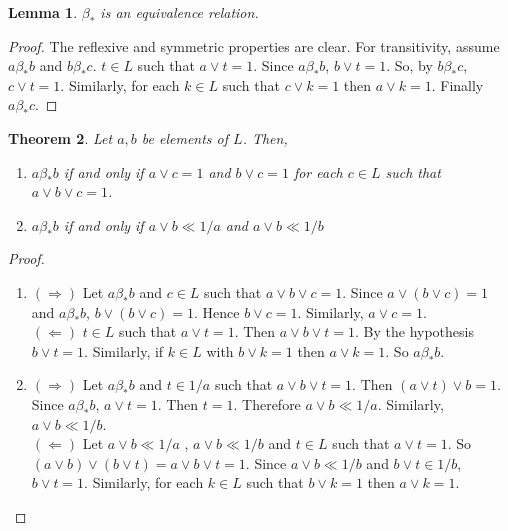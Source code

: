 \documentclass[a4paper,12pt]{article}
\newtheorem{theorem}{Theorem}[section]
\newtheorem{lemma}[theorem]{Lemma}
\numberwithin{equation}{section}
\begin{document}
\begin{lemma} \label{2}
  $ \beta_* $ is an equivalence relation.
\end{lemma}
\begin{proof}
  The reflexive and symmetric properties are clear. For transitivity, assume $ a \beta_*b $ and $ b \beta_* c $. 
  $ t \in L $ such that $ a \vee t = 1 $. Since $ a \beta_*b $, $ b \vee t = 1 $. So,  by $ b \beta_* c $, 
  $ c \vee t = 1 $. Similarly, for each $ k \in L $ such that $ c \vee k = 1 $ then $ a \vee k=1 $. 
  Finally $ a \beta_* c $.

\end{proof}

\begin{theorem} \label{3}
  Let $ a,b $ be elements of $ L $. Then,
  \begin{enumerate}[label=(\roman{*}), ref=(\roman{*})]

    \item
      $ a \beta_* b $ if and only if $ a \vee c = 1 $ and $ b \vee c = 1 $ for each $ c \in L $ 
      such that $ a \vee b  \vee c = 1 $.  \label{3.1}

    \item
      $ a \beta_* b $ if and only if $ a \vee b \ll 1/a $ and $ a \vee b \ll 1/b $  \label{3.2}

  \end{enumerate}
\end{theorem}


\begin{proof}
  \begin{enumerate}
    \item
      $ ( \Rightarrow ) $
      Let $ a \beta_* b$ and $ c \in L $ such that $ a \vee b \vee c = 1 $. Since $ a \vee ( b \vee c ) = 1 $ and 
      $ a \beta_* b $, $ b \vee ( b \vee c ) = 1 $. Hence $ b \vee c = 1 $. Similarly, $ a \vee c = 1 $. \\
      $( \Leftarrow )$
      $ t \in L $ such that $ a \vee t = 1 $. 
      Then $ a \vee b \vee t = 1 $. By the hypothesis $ b \vee t = 1 $. 
      Similarly, if $ k \in L $ with $ b \vee k = 1 $ then $ a \vee k = 1 $. So $ a \beta_* b $.
    \item
      $ ( \Rightarrow ) $
      Let $ a \beta_* b $ and $ t \in 1/a $ such that $ a \vee b \vee t = 1 $. 
      Then $ ( a \vee t ) \vee b = 1 $. Since $ a \beta_* b $, $ a \vee t = 1 $. 
      Then $ t=1 $. Therefore $ a \vee b \ll 1/a $. Similarly, $ a \vee b \ll 1/b $. \\
      $( \Leftarrow )$
      Let $ a \vee b \ll 1/a $ , $ a \vee b \ll 1/b $ and $ t \in L $ such that $ a \vee t = 1 $. 
      So $ ( a \vee b ) \vee ( b \vee t ) = a \vee b \vee t = 1 $. Since $ a \vee b \ll 1/b $ and 
      $ b \vee t \in 1/b $, $ b \vee t = 1 $. 
      Similarly, for each $ k \in L $ such that $ b \vee k = 1 $ then $ a \vee k = 1 $. 
  \end{enumerate}
\end{proof}
\end{document}
